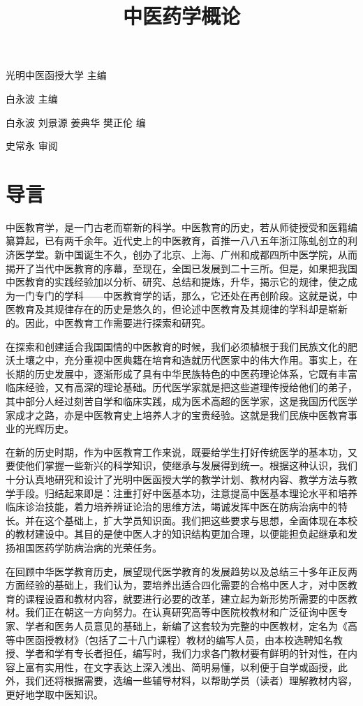 \documentclass[a4paper,12pt,UTF8,twoside]{ctexbook}
\title{\heiti\zihao{0} 中医药学概论}
\author{}
\date{}
\begin{document}
\maketitle
\tableofcontents

\frontmatter

光明中医函授大学 主编

白永波 主编

白永波 刘景源 姜典华 樊正伦 编

史常永 审阅

\chapter{导言}

中医教育学，是一门古老而崭新的科学。中医教育的历史，若从师徒授受和医籍编纂算起，已有两千余年。近代史上的中医教育，首推一八八五年浙江陈虬创立的利济医学堂。新中国诞生不久，创办了北京、上海、广州和成都四所中医学院，从而揭开了当代中医教育的序幕，至现在，全国已发展到二十三所。但是，如果把我国中医教育的实践经验加以分析、研究、总结和提炼，升华，揭示它的规律，使之成为一门专门的学科——中医教育学的话，那么，它还处在再创阶段。这就是说，中医教育及其规律存在的历史是悠久的，但论述中医教育及其规律的学科却是崭新的。因此，中医教育工作需要进行探索和研究。

在探索和创建适合我国国情的中医教育的时候，我们必须植根于我们民族文化的肥沃土壤之中，充分重视中医典籍在培育和造就历代医家中的伟大作用。事实上，在长期的历史发展中，逐渐形成了具有中华民族特色的中医药理论体系，它既有丰富临床经验，又有高深的理论基础。历代医学家就是把这些道理传授给他们的弟子，其中部分人经过刻苦自学和临床实践，成为医术高超的医学家，这是我国历代医学家成才之路，亦是中医教育史上培养人才的宝贵经验。这就是我们民族中医教育事业的光辉历史。

在新的历史时期，作为中医教育工作来说，既要给学生打好传统医学的基本功，又要使他们掌握一些新兴的科学知识，使继承与发展得到统一。根据这种认识，我们十分认真地研究和设计了光明中医函授大学的教学计划、教材内容、教学方法与教学手段。归结起来即是：注重打好中医基本功，注意提高中医基本理论水平和培养临床诊治技能，着力培养辨证论治的思维方法，竭诚发挥中医在防病治病中的特长。并在这个基础上，扩大学员知识面。我们把这些要求与思想，全面体现在本校的教材建设中。其目的是使中医人才的知识结构更加合理，以便能担负起继承和发扬祖国医药学防病治病的光荣任务。

在回顾中华医学教育历史，展望现代医学教育的发展趋势以及总结三十多年正反两方面经验的基础上，我们认为，要培养出适合四化需要的合格中医人才，对中医教育的课程设置和教材内容，就要进行必要的改革，建立起为新形势所需要的中医教材。我们正在朝这一方向努力。在认真研究高等中医院校教材和广泛征询中医专家、学者和医务人员意见的基础上，新编了这套较为完整的中医教材，定名为《高等中医函授教材》（包括了二十八门课程）教材的编写人员，由本校选聘知名教授、学者和学有专长者担任，编写时，我们力求各门教材要有鲜明的针对性，在内容上富有实用性，在文字表达上深入浅出、简明易懂，以利便于自学或函授，此外，我们还将根据需要，选编一些辅导材料，以帮助学员（读者）理解教材内容，更好地学取中医知识。
\end{document}
